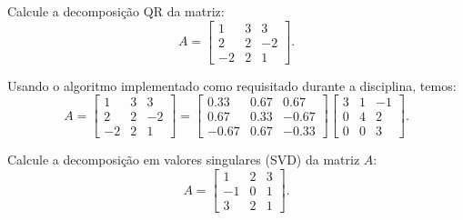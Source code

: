\begin{question}
  Calcule a decomposição QR da matriz:
  \[
    A = \begin{bmatrix}
      1  & 3 & 3  \\
      2  & 2 & -2 \\
      -2 & 2 & 1
    \end{bmatrix}.
  \]
\end{question}

\begin{resolution}
  Usando o algoritmo implementado como requisitado durante a disciplina, temos:
  $$
    A = \begin{bmatrix}
      1  & 3 & 3  \\
      2  & 2 & -2 \\
      -2 & 2 & 1
    \end{bmatrix} =
    \begin{bmatrix}
      0.33  & 0.67 & 0.67  \\
      0.67  & 0.33 & -0.67 \\
      -0.67 & 0.67 & -0.33
    \end{bmatrix}
    \begin{bmatrix}
      3 & 1 & -1 \\
      0 & 4 & 2  \\
      0 & 0 & 3
    \end{bmatrix}.
  $$
\end{resolution}

\begin{question}
  Calcule a decomposição em valores singulares (SVD) da matriz $A$:
  \[
    A = \begin{bmatrix}
      1  & 2 & 3 \\
      -1 & 0 & 1 \\
      3  & 2 & 1
    \end{bmatrix}.
  \]
\end{question}

